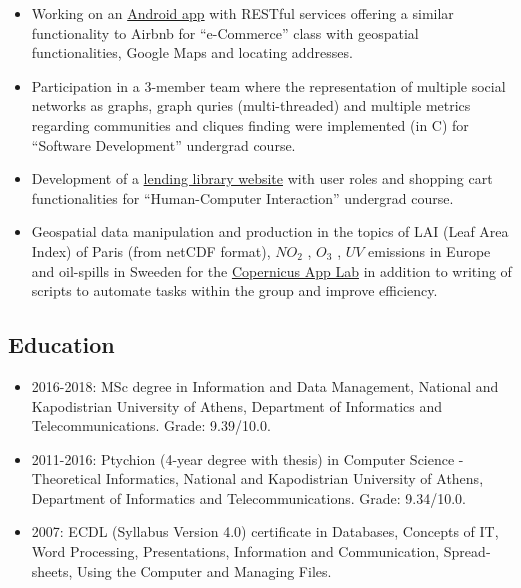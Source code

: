 \documentclass[a4paper,oneside,11pt]{article}
\begin{document}
\begin{itemize}
\begin{sloppypar}
\end{sloppypar}

\item Working on an \href{https://www.dropbox.com/sh/46dg71devshdvv1/AAAvynY_ZJJcsGwdC6ZGsQg5a?dl=0}{Android app} with RESTful services offering a similar functionality to Airbnb for ``e-Commerce'' class with geospatial functionalities, Google Maps and locating addresses.

\item Participation in a 3-member team where the representation of multiple social networks as graphs, graph quries (multi-threaded) and multiple metrics regarding communities and cliques finding were implemented (in C) for ``Software Development'' undergrad course.

\item Development of a \href{http://dl104.madgik.di.uoa.gr/eamgroup56/index.php}{lending library website} with user roles and shopping cart functionalities for ``Human-Computer Interaction'' undergrad course.

\item Geospatial data manipulation and production in the topics of LAI (Leaf Area Index) of Paris (from netCDF format), $NO_2$ , $O_3$ , $UV$ emissions in Europe and oil-spills in Sweeden for the \href{http://www.app-lab.eu/}{Copernicus App Lab} in addition to writing of scripts to automate tasks within the group and improve efficiency. 

\end{itemize}

\subsection*{Education}

\begin{itemize}

\item 2016-2018: MSc degree in Information and Data Management, National and Kapodistrian University of Athens, Department of Informatics and Telecommunications. Grade: 9.39/10.0.

\item 2011-2016: Ptychion (4-year degree with thesis) in Computer Science - Theoretical Informatics, National and Kapodistrian University of Athens, Department of Informatics and Telecommunications. Grade: 9.34/10.0.

\item 2007: \textlatin{ECDL (Syllabus Version 4.0)} certificate in \textlatin{Databases, Concepts of IT, Word Processing, Presentations, Information and Communication, Spreadsheets, Using the Computer and Managing Files}.

\end{itemize}
\end{document}
